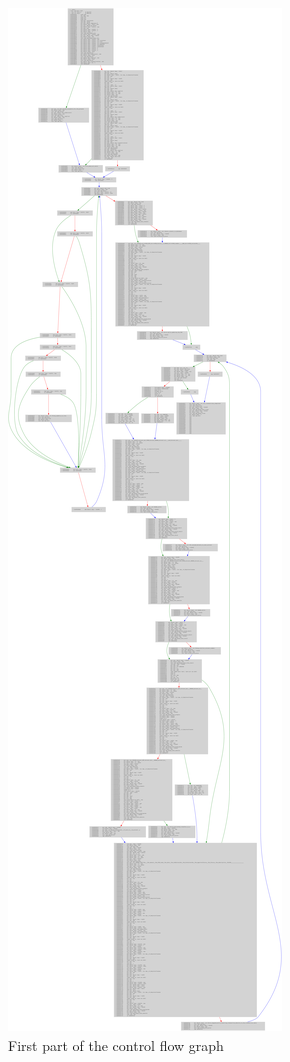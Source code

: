 \begin{figure}[h!tbp]
	\centering
	\includegraphics[trim={5cm 218cm 25cm 0},clip,height=\textheight]{figures/re_cfg}
	\caption{First part of the control flow graph}
	\label{figure:re_cfg}
\end{figure}

